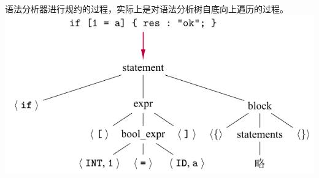 \documentclass[dvipsnames, svgnames, x11names]{beamer}
\begin{document}
\begin{frame}
    语法分析器进行规约的过程，实际上是对语法分析树自底向上遍历的过程。
    \includegraphics{../figure/parser2.pdf}
\end{frame}
\end{document}

